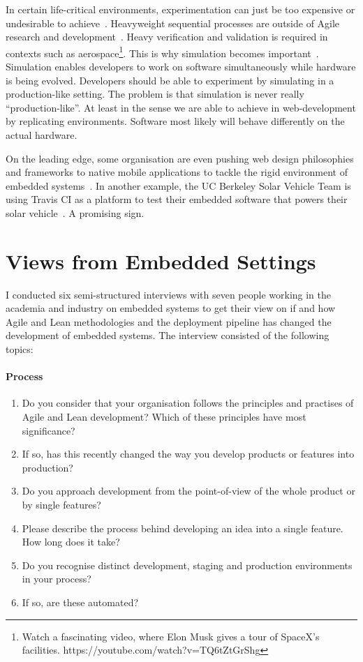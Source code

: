 \documentclass[english]{tktltiki2}
\begin{document}
In certain life-critical environments, experimentation can just be too expensive or undesirable to achieve~\cite{BE12}. Heavyweight sequential processes are outside of Agile research and development~\cite{EHS14}. Heavy verification and validation is required in contexts such as aerospace\footnote{Watch a fascinating video, where Elon Musk gives a tour of SpaceX’s facilities. https://youtube.com/watch?v=TQ6tZtGrShg}. This is why simulation becomes important~\cite{KRM13}. Simulation enables developers to work on software simultaneously while hardware is being evolved. Developers should be able to experiment by simulating in a production-like setting. The problem is that simulation is never really “production-like”. At least in the sense we are able to achieve in web-development by replicating environments. Software most likely will behave differently on the actual hardware.

On the leading edge, some organisation are even pushing web design philosophies and frameworks to native mobile applications to tackle the rigid environment of embedded systems~\cite{Boh13, GZ14}. In another example, the UC Berkeley Solar Vehicle Team is using Travis CI as a platform to test their embedded software that powers their solar vehicle~\cite{Ngy15}. A promising sign.


\section{Views from Embedded Settings}

I conducted six semi-structured interviews with seven people working in the academia and industry on embedded systems to get their view on if and how Agile and Lean methodologies and the deployment pipeline has changed the development of embedded systems. The interview consisted of the following topics:

\paragraph{Process}

\begin{enumerate}

    \item Do you consider that your organisation follows the principles and practises of Agile and Lean development? Which of these principles have most significance?
    \item If so, has this recently changed the way you develop products or features into production?
    \item Do you approach development from the point-of-view of the whole product or by single features?
    \item Please describe the process behind developing an idea into a single feature. How long does it take?
    \item Do you recognise distinct development, staging and production environments in your process?
    \item If so, are these automated?

\end{enumerate}
\end{document}
